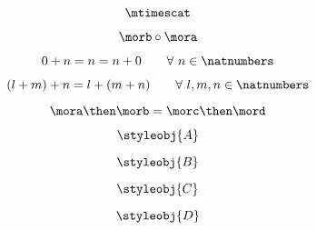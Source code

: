 {\begin{forslides}
 \begin{equation}\label{eq:42}
  \mtimescat
 \end{equation}
 
 \begin{equation}\label{eq:43}
  \morb \circ \mora
 \end{equation}
 
   \begin{equation}\label{eq:44}
  0 + n = n = n + 0   \quad \quad \forall \ n \in \natnumbers
 \end{equation}
 
 \begin{equation}\label{eq:45}
  (l + m) + n = l + (m + n) \quad \quad  \forall \ l, m, n \in \natnumbers
 \end{equation}
 
 \begin{equation}\label{eq:46}
  \mora \then \morb = \morc \then \mord
 \end{equation}
 
  \begin{equation}\label{eq:47}
  \styleobj{A}
 \end{equation}
 
 \begin{equation}\label{eq:48}
  \styleobj{B}
 \end{equation}
 
 \begin{equation}\label{eq:49}
  \styleobj{C}
 \end{equation}
 
 \begin{equation}\label{eq:50}
  \styleobj{D}
 \end{equation}

  \end{forslides}}
